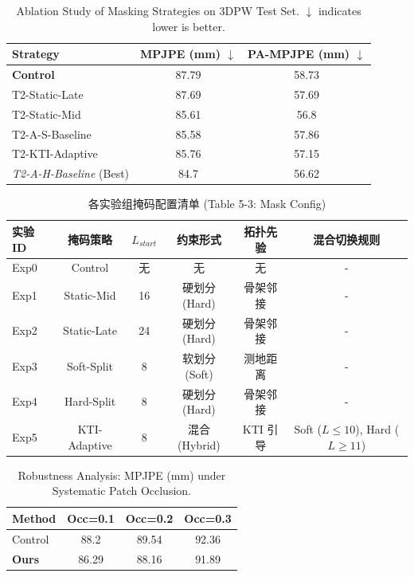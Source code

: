 \begin{table}[h]
\centering
\caption{Ablation Study of Masking Strategies on 3DPW Test Set. $\downarrow$ indicates lower is better.}
\label{tab:ablation_results}
\begin{tabular}{lcc}
\toprule
Strategy & MPJPE (mm) $\downarrow$ & PA-MPJPE (mm) $\downarrow$ \\
\midrule
\textbf{Control} & 87.79 & 58.73 \\
T2-Static-Late & 87.69 & 57.69 \\
T2-Static-Mid & 85.61 & 56.8 \\
T2-A-S-Baseline & 85.58 & 57.86 \\
T2-KTI-Adaptive & 85.76 & 57.15 \\
\textit{T2-A-H-Baseline} (Best) & 84.7 & 56.62 \\
\bottomrule
\end{tabular}
\end{table}

\begin{table}[htbp]
\centering
\caption{各实验组掩码配置清单 (Table 5-3: Mask Config)}
\label{tab:mask_config}
\begin{tabular}{l|ccccc}
\toprule
实验 ID & 掩码策略 & $L_{start}$ & 约束形式 & 拓扑先验 & 混合切换规则 \\
\midrule
Exp0 & Control & 无 & 无 & 无 & - \\
Exp1 & Static-Mid & 16 & 硬划分 (Hard) & 骨架邻接 & - \\
Exp2 & Static-Late & 24 & 硬划分 (Hard) & 骨架邻接 & - \\
Exp3 & Soft-Split & 8 & 软划分 (Soft) & 测地距离 & - \\
Exp4 & Hard-Split & 8 & 硬划分 (Hard) & 骨架邻接 & - \\
Exp5 & KTI-Adaptive & 8 & 混合 (Hybrid) & KTI 引导 & Soft ($L \le 10$), Hard ($L \ge 11$) \\
\bottomrule
\end{tabular}
\end{table}

\begin{table}[h]
\centering
\caption{Robustness Analysis: MPJPE (mm) under Systematic Patch Occlusion.}
\label{tab:robustness_results}
\begin{tabular}{lccc}
\toprule
Method & Occ=0.1 & Occ=0.2 & Occ=0.3 \\
\midrule
Control & 88.2 & 89.54 & 92.36 \\
\textbf{Ours} & 86.29 & 88.16 & 91.89 \\
\bottomrule
\end{tabular}
\end{table}